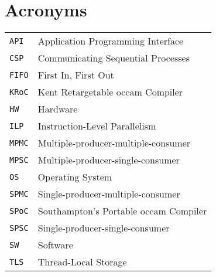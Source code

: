 
\chapter{Acronyms}

\begin{table}[h!]
    \centering
    \begin{tabular}{ll}
        \texttt{API}  & Application Programming Interface \\
        \texttt{CSP}  & Communicating Sequential Processes \\
        \texttt{FIFO} & First In, First Out \\
        \texttt{KRoC} & Kent Retargetable occam Compiler \\
        \texttt{HW}   & Hardware \\
        \texttt{ILP}  & Instruction-Level Parallelism \\
        \texttt{MPMC} & Multiple\hyp{}producer\hyp{}multiple\hyp{}consumer \\
        \texttt{MPSC} & Multiple\hyp{}producer\hyp{}single\hyp{}consumer \\
        \texttt{OS}   & Operating System \\
        \texttt{SPMC} & Single\hyp{}producer\hyp{}multiple\hyp{}consumer \\
        \texttt{SPoC} & Southampton's Portable occam Compiler \\
        \texttt{SPSC} & Single\hyp{}producer\hyp{}single\hyp{}consumer \\
        \texttt{SW}   & Software \\
        \texttt{TLS}  & Thread-Local Storage
    \end{tabular}
\end{table}